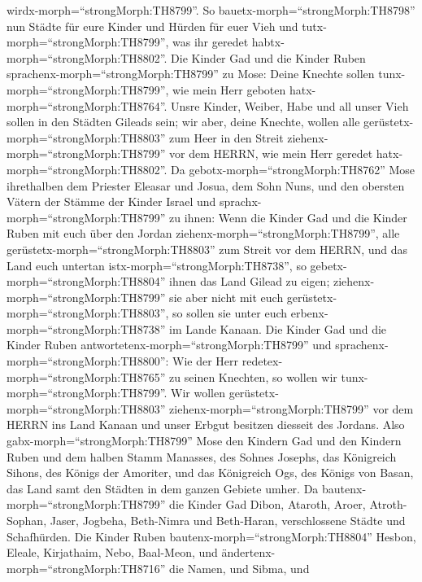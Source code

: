wirdx-morph=``strongMorph:TH8799''.  So
bauetx-morph=``strongMorph:TH8798'' nun Städte für eure Kinder und
Hürden für euer Vieh und tutx-morph=``strongMorph:TH8799'', was ihr
geredet habtx-morph=``strongMorph:TH8802''.  Die Kinder Gad
und die Kinder Ruben sprachenx-morph=``strongMorph:TH8799'' zu Mose:
Deine Knechte sollen tunx-morph=``strongMorph:TH8799'', wie mein Herr
geboten hatx-morph=``strongMorph:TH8764''.  Unsre Kinder,
Weiber, Habe und all unser Vieh sollen in den Städten Gileads sein;
 wir aber, deine Knechte, wollen alle
gerüstetx-morph=``strongMorph:TH8803'' zum Heer in den Streit
ziehenx-morph=``strongMorph:TH8799'' vor dem HERRN, wie mein Herr
geredet hatx-morph=``strongMorph:TH8802''.  Da
gebotx-morph=``strongMorph:TH8762'' Mose ihrethalben dem Priester
Eleasar und Josua, dem Sohn Nuns, und den obersten Vätern der Stämme der
Kinder Israel  und sprachx-morph=``strongMorph:TH8799'' zu
ihnen: Wenn die Kinder Gad und die Kinder Ruben mit euch über den Jordan
ziehenx-morph=``strongMorph:TH8799'', alle
gerüstetx-morph=``strongMorph:TH8803'' zum Streit vor dem HERRN, und das
Land euch untertan istx-morph=``strongMorph:TH8738'', so
gebetx-morph=``strongMorph:TH8804'' ihnen das Land Gilead zu eigen;
 ziehenx-morph=``strongMorph:TH8799'' sie aber nicht mit
euch gerüstetx-morph=``strongMorph:TH8803'', so sollen sie unter euch
erbenx-morph=``strongMorph:TH8738'' im Lande Kanaan.  Die
Kinder Gad und die Kinder Ruben
antwortetenx-morph=``strongMorph:TH8799'' und
sprachenx-morph=``strongMorph:TH8800'': Wie der Herr
redetex-morph=``strongMorph:TH8765'' zu seinen Knechten, so wollen wir
tunx-morph=``strongMorph:TH8799''.  Wir wollen
gerüstetx-morph=``strongMorph:TH8803''
ziehenx-morph=``strongMorph:TH8799'' vor dem HERRN ins Land Kanaan und
unser Erbgut besitzen diesseit des Jordans.  Also
gabx-morph=``strongMorph:TH8799'' Mose den Kindern Gad und den Kindern
Ruben und dem halben Stamm Manasses, des Sohnes Josephs, das Königreich
Sihons, des Königs der Amoriter, und das Königreich Ogs, des Königs von
Basan, das Land samt den Städten in dem ganzen Gebiete umher.
 Da bautenx-morph=``strongMorph:TH8799'' die Kinder Gad
Dibon, Ataroth, Aroer,  Atroth-Sophan, Jaser, Jogbeha,
 Beth-Nimra und Beth-Haran, verschlossene Städte und
Schafhürden.  Die Kinder Ruben
bautenx-morph=``strongMorph:TH8804'' Hesbon, Eleale, Kirjathaim,
 Nebo, Baal-Meon, und
ändertenx-morph=``strongMorph:TH8716'' die Namen, und Sibma, und
